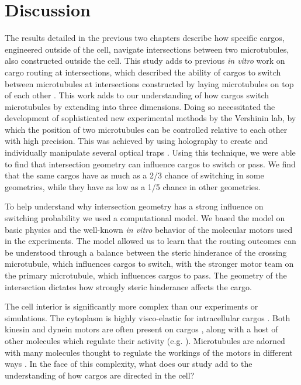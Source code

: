\chapter{Discussion}

The results detailed in the previous two chapters describe how specific cargos, engineered outside of the cell, navigate intersections between two microtubules, also constructed outside the cell.
This study adds to previous \textit{in vitro} work on cargo routing at intersections, which described the ability of cargos to switch between microtubules at intersections constructed by laying microtubules on top of each other \cite{Ross2008}.
This work adds to our understanding of how cargos switch microtubules by extending into three dimensions.
Doing so necessitated the development of sophisticated new experimental methods by the Vershinin lab, by which the position of two microtubules can be controlled relative to each other with high precision.
This was achieved by using holography to create and individually manipulate several optical traps \cite{Bergman2015}.
Using this technique, we were able to find that intersection geometry can influence cargos to switch or pass.
We find that the same cargos have as much as a 2/3 chance of switching in some geometries, while they have as low as a 1/5 chance in other geometries.

To help understand why intersection geometry has a strong influence on switching probability we used a computational model.
We based the model on basic physics and the well-known \textit{in vitro} behavior of the molecular motors used in the experiments.
The model allowed us to learn that the routing outcomes can be understood through a balance between the steric hinderance of the crossing microtubule, which influences cargos to switch, with the stronger motor team on the primary microtubule, which influences cargos to pass.
The geometry of the intersection dictates how strongly steric hinderance affects the cargo.

The cell interior is significantly more complex than our experiments or simulations.
The cytoplasm is highly visco-elastic for intracellular cargos \cite{Guo2014,Ahmed2018}.
Both kinesin and dynein motors are often present on cargos \cite{Gross2004,Hancock2014}, along with a host of other molecules which regulate their activity (e.g. \cite{Reddy2016}).
Microtubules are adorned with many molecules thought to regulate the workings of the motors in different ways \cite{Yu2015,Sirajuddin2014}.
In the face of this complexity, what does our study add to the understanding of how cargos are directed in the cell?

